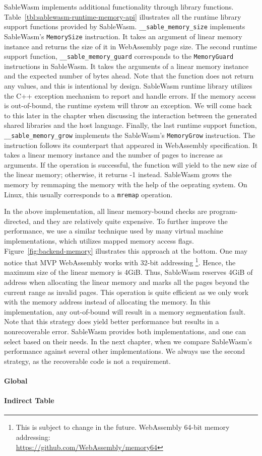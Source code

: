 SableWasm implements additional functionality through library functions. Table~\ref{tbl:sablewasm-runtime-memory-api} illustrates all the runtime library support functions provided by SableWasm. \texttt{\_\_sable\_memory\_size} implements SableWasm's \texttt{MemorySize} instruction. It takes an argument of linear memory instance and returns the size of it in WebAssembly page size. The second runtime support function, \texttt{\_\_sable\_memory\_guard} corresponds to the \texttt{MemoryGuard} instructions in SableWasm. It takes the arguments of a linear memory instance and the expected number of bytes ahead. Note that the function does not return any values, and this is intentional by design. SableWasm runtime library utilizes the C++ exception mechanism to report and handle errors. If the memory access is out-of-bound, the runtime system will throw an exception. We will come back to this later in the chapter when discussing the interaction between the generated shared libraries and the host language. Finally, the last runtime support function, \texttt{\_\_sable\_memory\_grow} implements the SableWasm's \texttt{MemoryGrow} instruction. The instruction follows its counterpart that appeared in WebAssembly specification. It takes a linear memory instance and the number of pages to increase as arguments. If the operation is successful, the function will yield to the new size of the linear memory; otherwise, it returns -1 instead. SableWasm grows the memory by remmaping the memory with the help of the oeprating system. On Linux, this usually corresponds to a \texttt{mremap} operation.

In the above implementation, all linear memory-bound checks are program-directed, and they are relatively quite expensive. To further improve the performance, we use a similar technique used by many virtual machine implementations, which utilizes mapped memory access flags. Figure~\ref{fig:backend-memory} illustrates this approach at the bottom. One may notice that MVP WebAssembly works with 32-bit addressing \footnote{This is subject to change in the future. WebAssembly 64-bit memory addressing:\\\url{https://github.com/WebAssembly/memory64}}. Hence, the maximum size of the linear memory is 4GiB. Thus, SableWasm reserves 4GiB of address when allocating the linear memory and marks all the pages beyond the current range as invalid pages.  This operation is quite efficient as we only work with the memory address instead of allocating the memory. In this implementation, any out-of-bound will result in a memory segmentation fault. Note that this strategy does yield better performance but results in a nonrecoverable error. SableWasm provides both implementations, and one can select based on their needs. In the next chapter, when we compare SableWasm's performance against several other implementations. We always use the second strategy, as the recoverable code is not a requirement.

\paragraph{Global}

\paragraph{Indirect Table}